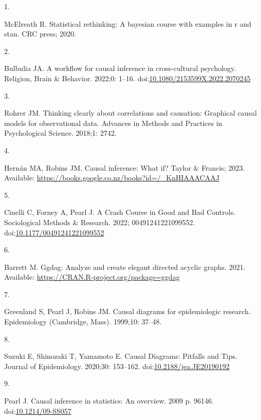 \documentclass[
  singlecolumn]{article}
\newlength{\cslhangindent}
\newlength{\csllabelwidth}
\newlength{\cslentryspacingunit} %
\newenvironment{CSLReferences}[2] %
 {%
  \setlength{\parindent}{0pt}
  \ifodd #1
  \let\oldpar\par
  \def\par{\hangindent=\cslhangindent\oldpar}
  \fi
  \setlength{\parskip}{#2\cslentryspacingunit}
 }%
 {}
\newcommand{\CSLLeftMargin}[1]{\parbox[t]{\csllabelwidth}{#1}}
\newcommand{\CSLRightInline}[1]{\parbox[t]{\linewidth - \csllabelwidth}{#1}\break}
\begin{document}
\hypertarget{refs}{}
\begin{CSLReferences}{0}{0}
\leavevmode{}%
\CSLLeftMargin{1. }%
\CSLRightInline{McElreath R. Statistical rethinking: A bayesian course
with examples in r and stan. CRC press; 2020. }

\leavevmode{}%
\CSLLeftMargin{2. }%
\CSLRightInline{Bulbulia JA. A workflow for causal inference in
cross-cultural psychology. Religion, Brain \& Behavior. 2022;0: 1--16.
doi:\href{https://doi.org/10.1080/2153599X.2022.2070245}{10.1080/2153599X.2022.2070245}}

\leavevmode{}%
\CSLLeftMargin{3. }%
\CSLRightInline{Rohrer JM. Thinking clearly about correlations and
causation: Graphical causal models for observational data. Advances in
Methods and Practices in Psychological Science. 2018;1: 2742. }

\leavevmode{}%
\CSLLeftMargin{4. }%
\CSLRightInline{Hernán MA, Robins JM. Causal inference: What if? Taylor
\& Francis; 2023. Available:
\url{https://books.google.co.nz/books?id=/_KnHIAAACAAJ}}

\leavevmode{}%
\CSLLeftMargin{5. }%
\CSLRightInline{Cinelli C, Forney A, Pearl J. A Crash Course in Good and
Bad Controls. Sociological Methods \& Research. 2022; 00491241221099552.
doi:\href{https://doi.org/10.1177/00491241221099552}{10.1177/00491241221099552}}

\leavevmode{}%
\CSLLeftMargin{6. }%
\CSLRightInline{Barrett M. Ggdag: Analyze and create elegant directed
acyclic graphs. 2021. Available:
\url{https://CRAN.R-project.org/package=ggdag}}

\leavevmode{}%
\CSLLeftMargin{7. }%
\CSLRightInline{Greenland S, Pearl J, Robins JM. Causal diagrams for
epidemiologic research. Epidemiology (Cambridge, Mass). 1999;10: 37--48.
}

\leavevmode{}%
\CSLLeftMargin{8. }%
\CSLRightInline{Suzuki E, Shinozaki T, Yamamoto E. Causal Diagrams:
Pitfalls and Tips. Journal of Epidemiology. 2020;30: 153--162.
doi:\href{https://doi.org/10.2188/jea.JE20190192}{10.2188/jea.JE20190192}}

\leavevmode{}%
\CSLLeftMargin{9. }%
\CSLRightInline{Pearl J. Causal inference in statistics: An overview.
2009 p. 96146.
doi:\href{https://doi.org/10.1214/09-SS057}{10.1214/09-SS057}}


\end{CSLReferences}
\end{document}
